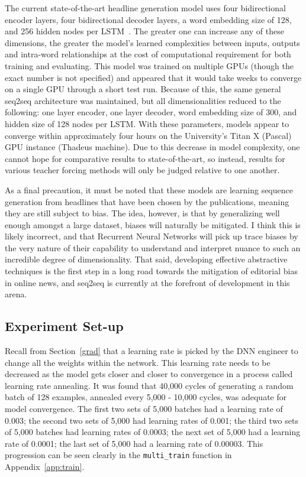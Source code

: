 The current state-of-the-art headline generation model uses four bidirectional encoder layers, four bidirectional decoder layers, a word embedding size of 128, and 256 hidden nodes per LSTM~\cite{Liu2016}. The greater one can increase any of these dimensions, the greater the model's learned complexities between inputs, outputs and intra-word relationships at the cost of computational requirement for both training and evaluating. This model was trained on multiple GPUs (though the exact number is not specified) and appeared that it would take weeks to converge on a single GPU through a short test run. Because of this, the same general seq2seq architecture was maintained, but all dimensionalities reduced to the following: one layer encoder, one layer decoder, word embedding size of 300, and hidden size of 128 nodes per LSTM. With these parameters, models appear to converge within approximately four hours on the University's Titan X (Pascal) GPU instance (Thadeus machine). Due to this decrease in model complexity, one cannot hope for comparative results to state-of-the-art, so instead, results for various teacher forcing methods will only be judged relative to one another.

As a final precaution, it must be noted that these models are learning sequence generation from headlines that have been chosen by the publications, meaning they are still subject to bias. The idea, however, is that by generalizing well enough amongst a large dataset, biases will naturally be mitigated. I think this is likely incorrect, and that Recurrent Neural Networks will pick up trace biases by the very nature of their capability to understand and interpret nuance to such an incredible degree of dimensionality. That said, developing effective abstractive techniques is the first step in a long road towards the mitigation of editorial bias in online news, and seq2seq is currently at the forefront of development in this arena.

\subsection{Experiment Set-up}
Recall from Section~\ref{grad} that a learning rate is picked by the DNN engineer to change all the weights within the network. This learning rate needs to be decreased as the model gets closer and closer to convergence in a process called learning rate annealing. It was found that 40,000 cycles of generating a random batch of 128 examples, annealed every 5,000 - 10,000 cycles, was adequate for model convergence. The first two sets of 5,000 batches had a learning rate of 0.003; the second two sets of 5,000 had learning rates of 0.001; the third two sets of 5,000 batches had learning rates of 0.0003; the next set of 5,000 had a learning rate of 0.0001; the last set of 5,000 had a learning rate of 0.00003. This progression can be seen clearly in the \texttt{multi\_train} function in Appendix~\ref{app:train}.


